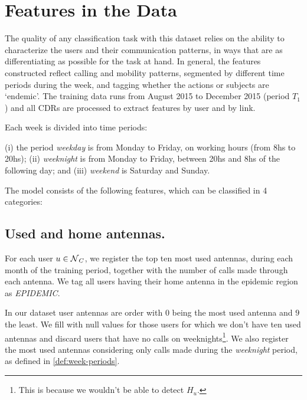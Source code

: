 \newpage

\section{Features in the Data}

The quality of any classification task with this dataset relies on the ability to characterize the users and their communication patterns, in ways that are as differentiating as possible for the task at hand. 
In general, the features constructed reflect calling and mobility patterns,
segmented by different time periods during the week, and tagging whether the actions or subjects are `endemic'. 
The training data runs from August 2015 to December 2015 (period $T_1$) and all CDRs are processed to extract features by user and by link. 

Each week is divided into time periods: 
\begin{definition} \label{def:week-periods}
	
	(i) the period \textit{weekday} is from Monday to Friday, on working hours (from 8hs to 20hs); (ii) \textit{weeknight} is from Monday to Friday, between 20hs and 8hs of the following day;
	and (iii) \textit{weekend} is Saturday and Sunday.	
\end{definition}


The model consists of the following features, which can be classified in 4 categories:


\subsection{Used and home antennas.}\label{homeantenna}

For each user $u \in \operatorname{\mathcal{N}}_C$, we register the top ten most used antennas, during each month of the training period,
together with the number of calls made through each antenna. We tag all users having their home antenna in the epidemic region as \textit{EPIDEMIC}. 

In our dataset user antennas are order with $0$ being the most used antenna and $9$ the least. We fill with null values for those users for which we don't have ten used antennas and discard users that have no calls on weeknights\footnote{This is because we wouldn't be able to detect $H_u$.}.
%
%
We also register the most used antennas considering only calls made during the \textit{weeknight} period, as defined in \cref{def:week-periods}. %


